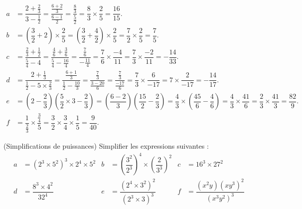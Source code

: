\documentclass[12pt,
addpoints,
fleqn
]{exam}
\begin{document}
\begin{questions}
    \begin{solution}
        \begin{align*}
            a & = \dfrac{2+\frac{2}{3}}{3-\frac{1}{2}} = \dfrac{\frac{6+2}{3}}{\frac{6-1}{2}} = \dfrac{\frac{8}{3}}{\frac{5}{2}} = \dfrac{8}{3}\times\dfrac{2}{5} = \boxed{\dfrac{16}{15}}.                                                                                                                                \\
            b & =\left(\dfrac{3}{2}+2\right)\times \dfrac{2}{5} = \left(\dfrac{3}{2}+\dfrac{4}{2}\right)\times\dfrac{2}{5} = \dfrac{7}{2}\times \dfrac{2}{5} = \boxed{\dfrac{7}{5}}.                                                                                                                                       \\
            c & =\dfrac{\frac{2}{3}+\frac{1}{2}}{\frac{5}{4}-4} = \dfrac{\frac{4}{6}+\frac{3}{6}}{\frac{5}{4}-\frac{16}{4}}=\dfrac{\frac{7}{6}}{-\frac{11}{4}}=\dfrac{7}{6}\times\dfrac{-4}{11}=\dfrac{7}{3}\times\dfrac{-2}{11} = \boxed{-\dfrac{14}{33}}.                                                                \\
            d & =\dfrac{2+\frac{1}{3}}{\frac{1}{2}-5\times\frac{2}{3}} = \dfrac{\frac{6+1}{3}}{\frac{1}{2}-\frac{10}{3}}=\dfrac{\frac{7}{3}}{\frac{3-20}{6}}=\dfrac{\frac{7}{3}}{\frac{-17}{6}}=\dfrac{7}{3}\times \dfrac{6}{-17} = 7\times\dfrac{2}{-17}=\boxed{-\dfrac{14}{17}}.                                         \\
            e & =\left(2-\dfrac{2}{3}\right)\left(\dfrac{5}{2}\times 3 - \dfrac{2}{3}\right) = \left(\dfrac{6-2}{3}\right)\left(\dfrac{15}{2}-\dfrac{2}{3}\right) = \dfrac{4}{3}\times\left( \dfrac{45}{6}-\dfrac{4}{6}\right) = \dfrac{4}{3}\times\dfrac{41}{6} =\dfrac{2}{3}\times\dfrac{41}{3} = \boxed{\dfrac{82}{9}}. \\
            f & =\dfrac{1}{\frac{2}{3}}\times\dfrac{\frac{3}{4}}{5} = \dfrac{3}{2}\times\dfrac{3}{4}\times\dfrac{1}{5}= \boxed{\dfrac{9}{40}}.
        \end{align*}

    \end{solution}


    \question (Simplifications de puissances) Simplifier les expressions suivantes :
    \begin{align*}
        a & = \left(2^3\times 5^2\right)^3\times 2^4 \times 5^2 & b & =\left(\dfrac{3^2}{2^3}\right)^4\times\left(\dfrac{2}{3^3}\right)^2 & c & =16^3\times 27^2                                          \\
        d & =\dfrac{8^3\times 4^2}{32^4}                        & e & =\dfrac{\left(2^4\times 3^2\right)^2}{\left(2^3\times 3\right)^3}   & f & =\dfrac{(x^2y)\left(xy^3\right)^2}{\left(x^3y^2\right)^3}
    \end{align*}


\end{questions}
\end{document}

